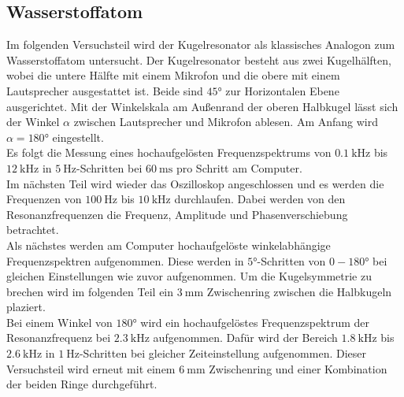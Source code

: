 \subsection{Wasserstoffatom}
Im folgenden Versuchsteil wird der Kugelresonator als klassisches Analogon zum Wasserstoffatom untersucht.
Der Kugelresonator besteht aus zwei Kugelhälften, wobei die untere Hälfte mit einem Mikrofon und die obere mit einem Lautsprecher ausgestattet ist.
Beide sind $\ang{45;;}$ zur Horizontalen Ebene ausgerichtet.
Mit der Winkelskala am Außenrand der oberen Halbkugel lässt sich der Winkel $\alpha$ zwischen Lautsprecher und Mikrofon ablesen.
Am Anfang wird $\alpha = \ang{180;;}$ eingestellt.
\\
 Es folgt die Messung eines hochaufgelösten Frequenzspektrums von $\SI{0.1}{\kilo\hertz}$ bis $\SI{12}{\kilo\hertz}$ 
in $\SI{5}{\hertz}$-Schritten bei $\SI{60}{\milli\second}$ pro Schritt am Computer.
\\
Im nächsten Teil wird wieder das Oszilloskop angeschlossen und es werden die Frequenzen von $\SI{100}{\hertz}$ bis $\SI{10}{\kilo\hertz}$ durchlaufen.
Dabei werden von den Resonanzfrequenzen die Frequenz, Amplitude und Phasenverschiebung betrachtet.
\\
Als nächstes werden am Computer hochaufgelöste winkelabhängige Frequenzspektren aufgenommen. Diese werden in $\ang{5;;}$-Schritten von $0-\ang{180;;}$ bei gleichen Einstellungen wie zuvor aufgenommen.
Um die Kugelsymmetrie zu brechen wird im folgenden Teil ein $\SI{3}{\milli\meter}$ Zwischenring zwischen die Halbkugeln plaziert.
\\
Bei einem Winkel von $\ang{180;;}$ wird ein hochaufgelöstes Frequenzspektrum der Resonanzfrequenz bei $\SI{2.3}{\kilo\hertz}$ aufgenommen.
Dafür wird der Bereich $\SI{1.8}{\kilo\hertz}$ bis  $\SI{2.6}{\kilo\hertz}$ in  $\SI{1}{\hertz}$-Schritten bei gleicher Zeiteinstellung aufgenommen.
Dieser Versuchsteil wird erneut mit einem $\SI{6}{\milli\meter}$ Zwischenring und einer Kombination der beiden Ringe durchgeführt.

